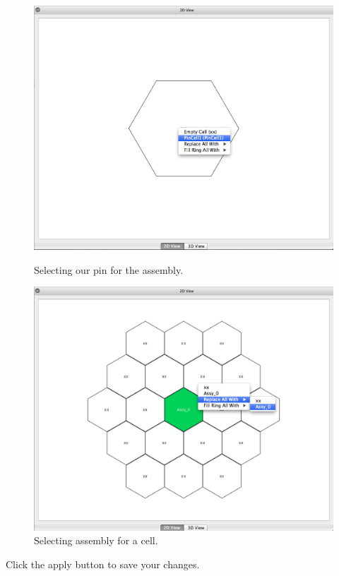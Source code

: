 \begin{figure}[h]
\centering
\begin{minipage}{.45\textwidth}
  \centering
  	\includegraphics[width=0.9\linewidth]{Images/hex-set-pin.png}
	\caption{Selecting our pin for the assembly.}
	\label{fig:Hex18}
\end{minipage}%
\hspace{0.5cm}
\begin{minipage}{.45\textwidth}
  \centering
	\includegraphics[width=0.9\linewidth]{Images/hex-assign-assy.png}
	\caption{Selecting assembly for a cell.}
	\label{fig:Hex19}
\end{minipage}
\end{figure}

Click the apply button to save your changes.


